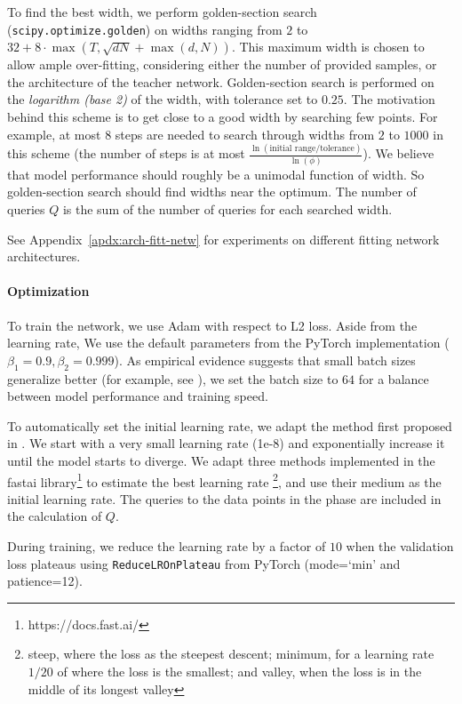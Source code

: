 \documentclass[twoside,11pt]{article}
\begin{document}
To find the best width, we perform golden-section search (\verb|scipy.optimize.golden|) on widths ranging from $2$ to $32+8\cdot \max(T, \sqrt{dN} + \max(d, N))$.
This maximum width is chosen to allow ample over-fitting, considering either the number of provided samples, or the architecture of the teacher network.
Golden-section search is performed on the \emph{logarithm (base 2)} of the width, with tolerance set to $0.25$.
The motivation behind this scheme is to get close to a good width by searching few points.
For example, at most $8$ steps are needed to search through widths from $2$ to $1000$ in this scheme
(the number of steps is at most $\frac{\ln(\text{initial range}/\text{tolerance})}{\ln(\phi)}$).
We believe that model performance should roughly be a unimodal function of width.
So golden-section search should find widths near the optimum.
The number of queries $Q$ is the sum of the number of queries for each searched width.

See Appendix~\ref{apdx:arch-fitt-netw} for experiments on different fitting network architectures.

\paragraph{Optimization}
To train the network, we use Adam \citep{2015-Kingma-adam} with respect to L2 loss.
Aside from the learning rate, We use the default parameters from the PyTorch implementation ($\beta_1=0.9, \beta_2=0.999$).
As empirical evidence suggests that small batch sizes generalize better
(for example, see \citet{2017-Keskar-on-large-batch-training}),
we set the batch size to $64$ for a balance between model performance and training speed.

To automatically set the initial learning rate, we adapt the method first proposed in \citet{2017-Smith-cyclical-learning-rates}.
We start with a very small learning rate (1e-8) and exponentially increase it until the model starts to diverge.
We adapt three methods implemented in the fastai library\footnote{https://docs.fast.ai/} to estimate the best learning rate \footnote{steep, where the loss as the steepest descent; minimum, for a learning rate $1/20$ of where the loss is the smallest; and valley, when the loss is in the middle of its longest valley}, and use their medium as the initial learning rate.
The queries to the data points in the phase are included in the calculation of $Q$.

During training, we reduce the learning rate by a factor of $10$ when the validation loss plateaus using \verb|ReduceLROnPlateau| from PyTorch (mode=`min' and patience=12).
\end{document}
